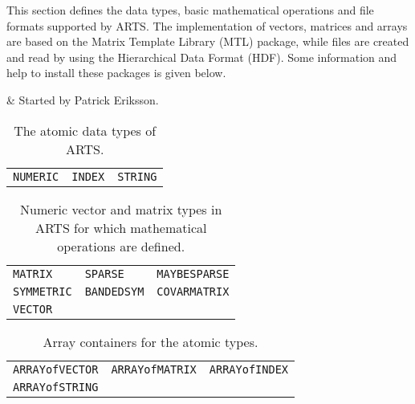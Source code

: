 %
%
 \label{sec:formats}
 
 This section defines the data types, basic mathematical operations
 and file formats supported by ARTS. The implementation of vectors,
 matrices and arrays are based on the Matrix Template Library (MTL)
 package, while files are created and read by using the Hierarchical
 Data Format (HDF). Some information and help to install these packages
 is given below.

%
%
 & Started by Patrick Eriksson. \\
\stophistory


 \label{sec:formats:datatypes}

 \begin{table}[t]
  \begin{tabular}{p{4.5cm} p{4.5cm} p{4.5cm}}
   \verb|NUMERIC|        & \verb|INDEX|         & \verb|STRING|         \\
  \end{tabular}
  \caption{The atomic data types of ARTS.}
  \label{table:format:atomic}
 \end{table}

 \begin{table}[t]
  \begin{tabular}{p{4.5cm} p{4.5cm} p{4.5cm}}
   \verb|MATRIX|         & \verb|SPARSE|         & \verb|MAYBESPARSE|    \\
   \verb|SYMMETRIC|      & \verb|BANDEDSYM|      & \verb|COVARMATRIX|    \\
   \verb|VECTOR|         &                       &                       \\
  \end{tabular}
  \caption{Numeric vector and matrix types in ARTS for which mathematical 
           operations are defined.}
  \label{table:format:nummath}
 \end{table}

 \begin{table}[t]
  \begin{tabular}{p{4.5cm} p{4.5cm} p{4.5cm}}
   \verb|ARRAYofVECTOR|  & \verb|ARRAYofMATRIX|  & \verb|ARRAYofINDEX|   \\
   \verb|ARRAYofSTRING|  &                       &                        \\
  \end{tabular}
  \caption{Array containers for the atomic types.}
  \label{table:format:atomicarrays}
 \end{table}

